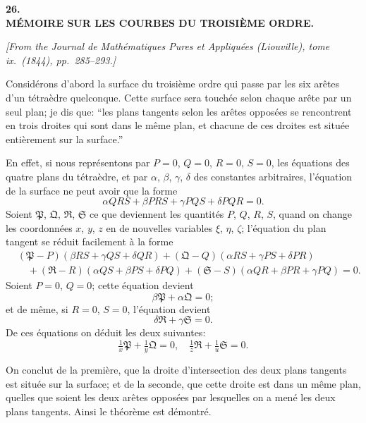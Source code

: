 \documentclass[12pt,a4paper]{article}
\providecommand{\fS}{\mathfrak{S}}
\providecommand{\fP}{\mathfrak{P}}
\providecommand{\fQ}{\mathfrak{Q}}
\providecommand{\fR}{\mathfrak{R}}
\begin{document}
\begin{center}
\textbf{\Large 26.}\\[1em]
\textbf{\Large M\'EMOIRE SUR LES COURBES DU TROISI\`EME ORDRE.}
\end{center}

\textit{[From the Journal de Math\'ematiques Pures et Appliqu\'ees (Liouville), tome ix.~(1844), pp.~285--293.]}

\bigskip

Consid\'erons d'abord la surface du troisi\`eme ordre qui passe par les six ar\^etes d'un t\'etra\`edre quelconque. Cette surface sera touch\'ee selon chaque ar\^ete par un seul plan; je dis que: ``les plans tangents selon les ar\^etes oppos\'ees se rencontrent en trois droites qui sont dans le m\^eme plan, et chacune de ces droites est situ\'ee enti\`erement sur la surface.''

En effet, si nous repr\'esentons par $P = 0$, $Q = 0$, $R = 0$, $S = 0$, les \'equations des quatre plans du t\'etra\`edre, et par $\alpha$, $\beta$, $\gamma$, $\delta$ des constantes arbitraires, l'\'equation de la surface ne peut avoir que la forme
\[
\alpha QRS + \beta PRS + \gamma PQS + \delta PQR = 0.
\]
Soient $\fP$, $\fQ$, $\fR$, $\fS$ ce que deviennent les quantit\'es $P$, $Q$, $R$, $S$, quand on change les coordonn\'ees $x$, $y$, $z$ en de nouvelles variables $\xi$, $\eta$, $\zeta$; l'\'equation du plan tangent se r\'eduit facilement \`a la forme
\begin{align*}
&(\fP - P)(\beta RS + \gamma QS + \delta QR) + (\fQ - Q)(\alpha RS + \gamma PS + \delta PR)\\
&\quad + (\fR - R)(\alpha QS + \beta PS + \delta PQ) + (\fS - S)(\alpha QR + \beta PR + \gamma PQ) = 0.
\end{align*}
Soient $P = 0$, $Q = 0$; cette \'equation devient
\[
\beta\fP + \alpha\fQ = 0;
\]
et de m\^eme, si $R = 0$, $S = 0$, l'\'equation devient
\[
\delta\fR + \gamma\fS = 0.
\]
De ces \'equations on d\'eduit les deux suivantes:
\[
\tfrac{1}{x}\fP + \tfrac{1}{y}\fQ = 0,\quad \tfrac{1}{z}\fR + \tfrac{1}{u}\fS = 0.
\]

\newpage
\setcounter{page}{184}

On conclut de la premi\`ere, que la droite d'intersection des deux plans tangents est situ\'ee sur la surface; et de la seconde, que cette droite est dans un m\^eme plan, quelles que soient les deux ar\^etes oppos\'ees par lesquelles on a men\'e les deux plans tangents. Ainsi le th\'eor\`eme est d\'emontr\'e.
\end{document}
